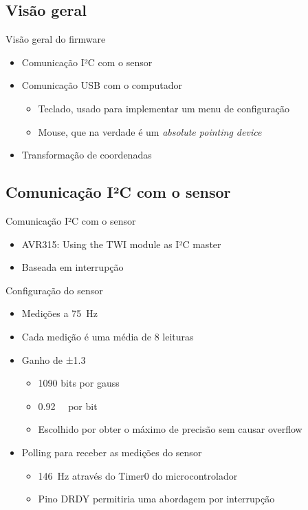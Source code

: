 \documentclass{beamer}
\begin{document}
\subsection{Visão geral}

\begin{frame}{Visão geral do firmware}
	\begin{itemize}
		\pause
		\item Comunicação I²C com o sensor
		\pause
		\item Comunicação USB com o computador
		\begin{itemize}
			\pause
			\item Teclado\pause, usado para implementar um menu de configuração
			\pause
			\item Mouse\pause, que na verdade é um \emph{absolute pointing device}
		\end{itemize}
		\pause
		\item Transformação de coordenadas
	\end{itemize}
\end{frame}


\subsection{Comunicação I²C com o sensor}

\begin{frame}{Comunicação I²C com o sensor}
	\pause
	\begin{itemize}[<+->]
		\item AVR315: Using the TWI module as I²C master
		\item Baseada em interrupção
	\end{itemize}
\end{frame}


\begin{frame}{Configuração do sensor}
	\begin{itemize}
		\pause
		\item Medições a \SI{75}{\hertz}
		\pause
		\item Cada medição é uma média de 8 leituras
		\pause
		\item Ganho de ±\SI{1.3}{\gauss}
		\pause
		\begin{itemize}
			\item \num{1090} bits por gauss
			\item \SI{0.92}{\milli\gauss} por bit
			\pause
			\item Escolhido por obter o máximo de precisão sem causar overflow
		\end{itemize}
		\pause
		\item Polling para receber as medições do sensor
		\begin{itemize}
			\pause
			\item \SI{146}{\hertz} através do Timer0 do microcontrolador
			\pause
			\item Pino DRDY permitiria uma abordagem por interrupção
		\end{itemize}
	\end{itemize}
\end{frame}
\end{document}

